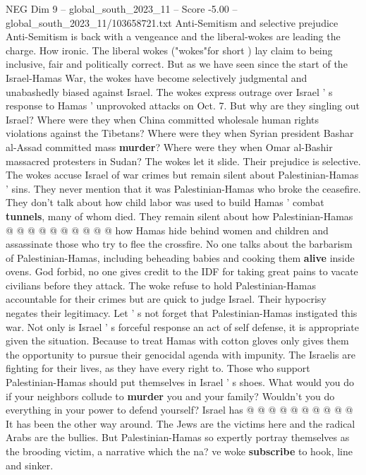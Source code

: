\begin{textsample}{NEG Dim 9 – global\_south\_2023\_11 – Score -5.00 – global\_south\_2023\_11/103658721.txt}  \label{ex:f9_neg_317}
Anti-Semitism and selective prejudice Anti-Semitism is back with a vengeance and the liberal-wokes are leading the charge.
How ironic.
The liberal wokes ("wokes"for short ) lay claim to being inclusive, fair and politically correct.
But as we have seen since the start of the Israel-Hamas War, the wokes have become selectively judgmental and unabashedly biased against Israel.
The wokes express outrage over Israel ' s response to Hamas ' unprovoked attacks on Oct. 7.
But why are they singling out Israel?
Where were they when China committed wholesale human rights violations against the Tibetans?
Where were they when Syrian president Bashar al-Assad committed mass \textbf{murder}?
Where were they when Omar al-Bashir massacred protesters in Sudan?
The wokes let it slide.
Their prejudice is selective.
The wokes accuse Israel of war crimes but remain silent about Palestinian-Hamas ' sins.
They never mention that it was Palestinian-Hamas who broke the ceasefire.
They don't talk about how child labor was used to build Hamas ' combat \textbf{tunnels}, many of whom died.
They remain silent about how Palestinian-Hamas @ @ @ @ @ @ @ @ @ @ how Hamas hide behind women and children and assassinate those who try to flee the crossfire.
No one talks about the barbarism of Palestinian-Hamas, including beheading babies and cooking them \textbf{alive} inside ovens.
God forbid, no one gives credit to the IDF for taking great pains to vacate civilians before they attack.
The woke refuse to hold Palestinian-Hamas accountable for their crimes but are quick to judge Israel.
Their hypocrisy negates their legitimacy.
Let ' s not forget that Palestinian-Hamas instigated this war.
Not only is Israel ' s forceful response an act of self defense, it is appropriate given the situation.
Because to treat Hamas with cotton gloves only gives them the opportunity to pursue their genocidal agenda with impunity.
The Israelis are fighting for their lives, as they have every right to.
Those who support Palestinian-Hamas should put themselves in Israel ' s shoes.
What would you do if your neighbors collude to \textbf{murder} you and your family?
Wouldn't you do everything in your power to defend yourself?
Israel has @ @ @ @ @ @ @ @ @ @ It has been the other way around.
The Jews are the victims here and the radical Arabs are the bullies.
But Palestinian-Hamas so expertly portray themselves as the brooding victim, a narrative which the na? ve woke \textbf{subscribe} to hook, line and sinker.

\end{textsample}
